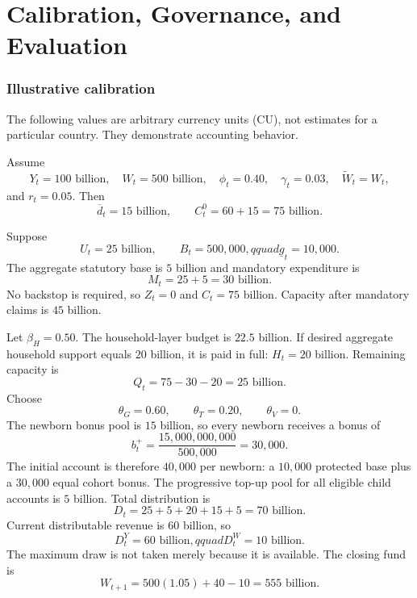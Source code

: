 \documentclass[11pt]{article}
\begin{document}
\part{Calibration, Governance, and Evaluation}

\section{Illustrative calibration}

The following values are arbitrary currency units (CU), not estimates for a particular
country. They demonstrate accounting behavior.

Assume
\begin{equation*}
  Y_t=100\text{ billion},\quad
  W_t=500\text{ billion},\quad
  \phi_t=0.40,\quad
  \gamma_t=0.03,\quad
  \widetilde W_t=W_t,
\end{equation*}
and $r_t=0.05$. Then
\begin{equation*}
  \overline d_t=15\text{ billion},
  \qquad
  C_t^0=60+15=75\text{ billion}.
\end{equation*}

Suppose
\begin{equation*}
  U_t=25\text{ billion},\qquad
  B_t=500{,}000,qquad
  \underline g_t=10{,}000.
\end{equation*}
The aggregate statutory base is $5$ billion and mandatory expenditure is
\begin{equation*}
  M_t=25+5=30\text{ billion}.
\end{equation*}
No backstop is required, so $Z_t=0$ and $C_t=75$ billion. Capacity after mandatory
claims is $45$ billion.

Let $\beta_H=0.50$. The household-layer budget is $22.5$ billion. If desired aggregate
household support equals $20$ billion, it is paid in full: $H_t=20$ billion. Remaining
capacity is
\begin{equation*}
  Q_t=75-30-20=25\text{ billion}.
\end{equation*}
Choose
\begin{equation*}
  \theta_G=0.60,\qquad
  \theta_T=0.20,\qquad
  \theta_V=0.
\end{equation*}
The newborn bonus pool is $15$ billion, so every newborn receives a bonus of
\begin{equation*}
  b_t^+=\frac{15{,}000{,}000{,}000}{500{,}000}=30{,}000.
\end{equation*}
The initial account is therefore $40{,}000$ per newborn: a $10{,}000$ protected base
plus a $30{,}000$ equal cohort bonus. The progressive top-up pool for all eligible child
accounts is $5$ billion. Total distribution is
\begin{equation*}
  D_t=25+5+20+15+5=70\text{ billion}.
\end{equation*}
Current distributable revenue is $60$ billion, so
\begin{equation*}
  D_t^Y=60\text{ billion},qquad
  D_t^W=10\text{ billion}.
\end{equation*}
The maximum draw is not taken merely because it is available. The closing fund is
\begin{equation*}
  W_{t+1}=500(1.05)+40-10=555\text{ billion}.
\end{equation*}
\end{document}
